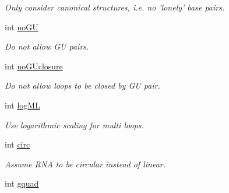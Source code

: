\begin{DoxyCompactItemize}
\begin{DoxyCompactList}\small\item\em Only consider canonical structures, i.\-e. no 'lonely' base pairs. \end{DoxyCompactList}\item 
\hypertarget{group__model__details_ad64a5eaf9c4550e7525b36a725fec4b2}{int \hyperlink{group__model__details_ad64a5eaf9c4550e7525b36a725fec4b2}{no\-G\-U}}\label{group__model__details_ad64a5eaf9c4550e7525b36a725fec4b2}

\begin{DoxyCompactList}\small\item\em Do not allow G\-U pairs. \end{DoxyCompactList}\item 
\hypertarget{group__model__details_a7e883db1f33f8f3baa5c9b140350c78e}{int \hyperlink{group__model__details_a7e883db1f33f8f3baa5c9b140350c78e}{no\-G\-Uclosure}}\label{group__model__details_a7e883db1f33f8f3baa5c9b140350c78e}

\begin{DoxyCompactList}\small\item\em Do not allow loops to be closed by G\-U pair. \end{DoxyCompactList}\item 
\hypertarget{group__model__details_ae259f89a94acae0c7f1412603e7f57b5}{int \hyperlink{group__model__details_ae259f89a94acae0c7f1412603e7f57b5}{log\-M\-L}}\label{group__model__details_ae259f89a94acae0c7f1412603e7f57b5}

\begin{DoxyCompactList}\small\item\em Use logarithmic scaling for multi loops. \end{DoxyCompactList}\item 
\hypertarget{group__model__details_a92762e1008503d4623ff5c01e358a464}{int \hyperlink{group__model__details_a92762e1008503d4623ff5c01e358a464}{circ}}\label{group__model__details_a92762e1008503d4623ff5c01e358a464}

\begin{DoxyCompactList}\small\item\em Assume R\-N\-A to be circular instead of linear. \end{DoxyCompactList}\item 
\hypertarget{group__model__details_af88a511a2b1f526b4c6213de6cb8fd6e}{int \hyperlink{group__model__details_af88a511a2b1f526b4c6213de6cb8fd6e}{gquad}}\label{group__model__details_af88a511a2b1f526b4c6213de6cb8fd6e}


\end{DoxyCompactItemize}
